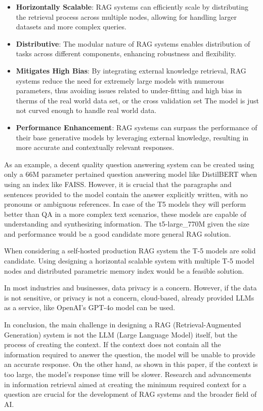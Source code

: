 \documentclass{wseas}
\begin{document}
\begin{itemize}

\item
  \textbf{Horizontally Scalable}: RAG systems can efficiently scale by
  distributing the retrieval process across multiple nodes, allowing for
  handling larger datasets and more complex queries.
\item
  \textbf{Distributive}: The modular nature of RAG systems enables
  distribution of tasks across different components, enhancing
  robustness and flexibility.
\item
  \textbf{Mitigates High Bias}: By integrating external knowledge
  retrieval, RAG systems reduce the need for extremely large models with
  numerous parameters, thus avoiding issues related to under-fitting and
  high bias in therms of the real world data set, or the cross
  validation set The model is just not curved enough to handle real
  world data.
\item
  \textbf{Performance Enhancement}: RAG systems can surpass the
  performance of their base generative models by leveraging external
  knowledge, resulting in more accurate and contextually relevant
  responses.
\end{itemize}

As an example, a decent quality question answering system can be created
using only a 66M parameter pertained question answering model like
DistilBERT when using an index like FAISS. However, it is crucial that
the paragraphs and sentences provided to the model contain the answer
explicitly written, with no pronouns or ambiguous references. In case of
the T5 models they will perform better than QA in a more complex text
scenarios, these models are capable of understanding and synthesizing
information. The t5-large\_770M given the size and performance would be
a good candidate more general RAG solution. 

When considering a self-hosted production RAG system the T-5 models 
are solid candidate. Using designing a horizontal scalable system with
multiple T-5 model nodes and distributed parametric memory index would be
a feasible solution.

In most industries and businesses, data privacy is a concern. However,
if the data is not sensitive, or privacy is not a concern, cloud-based,
already provided LLMs as a service, like OpenAI's GPT-4o model can be used.

In conclusion, the main challenge in designing a RAG (Retrieval-Augmented Generation) 
system is not the LLM (Large Language Model) itself, but the process of creating the context. 
If the context does not contain all the information required to answer the question, 
the model will be unable to provide an accurate response. On the other hand, as shown in this paper, 
if the context is too large, the model's response time will be slower. Research and advancements 
in information retrieval aimed at creating the minimum required context for a question are crucial 
for the development of RAG systems and the broader field of AI.
\end{document}
